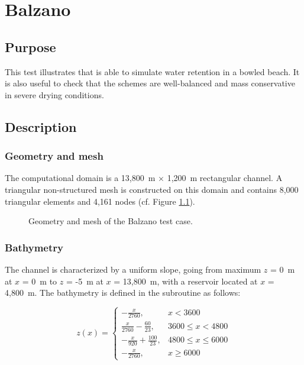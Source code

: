\chapter{Balzano}

\section{Purpose}

This test illustrates that  is able to simulate water retention in a bowled beach.
It is also useful to check that the schemes are well-balanced and
mass conservative in severe drying conditions.

%
\section{Description}

\subsection{Geometry and mesh}
\label{subsection:balzano:bathy}

The computational domain is a 13,800~m $\times$ 1,200~m rectangular channel.
A triangular non-structured mesh is constructed on this domain and contains
8,000 triangular elements and 4,161 nodes (cf. Figure \ref{fig:balzano:mesh}).

\begin{figure}[H]
  \centering
  \caption{Geometry and mesh of the Balzano test case.}\label{fig:balzano:mesh}
\end{figure}

\subsection{Bathymetry}

The channel is characterized by a uniform slope,
going from maximum $z$ = 0~m at $x$ = 0~m to $z$ = -5~m at $x$ = 13,800~m, with a
reservoir located at $x$ = 4,800~m.
The bathymetry is defined in the  subroutine as follows:

\begin{equation}
   z(x) =
    \begin{cases}
      -\frac{x}{2760} ,& x < 3600\\
       \frac{x}{2760} - \frac{60}{23} ,&  3600 \leq x < 4800\\
       -\frac{x}{920} + \frac{100}{23} ,& 4800 \leq x \leq 6000 \\
       -\frac{x}{2760} ,& x \ge 6000
    \end{cases}
    \label{eq:balzano:analytical}
\end{equation}


